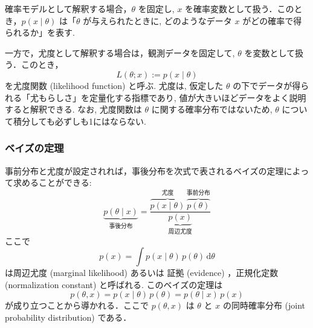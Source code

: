 \documentclass[titlepage]{ltjsbook}
\begin{document}
確率モデルとして解釈する場合，$\theta$ を固定し, $x$ を確率変数として扱う．このとき，$p(x \mid \theta)$ は「$\theta$ が与えられたときに, どのようなデータ $x$ がどの確率で得られるか」を表す. 

一方で，尤度として解釈する場合は，観測データを固定して, $\theta$ を変数として扱う．このとき，
\begin{equation}
L(\theta; x) := p(x \mid \theta)
\end{equation}
を尤度関数 (likelihood function) と呼ぶ. 尤度は, 仮定した $\theta$ の下でデータが得られる「尤もらしさ」を定量化する指標であり, 値が大きいほどデータをよく説明すると解釈できる. なお, 尤度関数は $\theta$ に関する確率分布ではないため, $\theta$ について積分しても必ずしも1にはならない. 

\subsubsection{ベイズの定理}
事前分布と尤度が設定されれば，事後分布を次式で表されるベイズの定理によって求めることができる: 
\begin{equation}
\underbrace{p(\theta \mid x)}_{\text{事後分布}} = \frac{\overbrace{p(x \mid \theta)}^{\text{尤度}}\, \overbrace{p(\theta)}^{\text{事前分布}}}{\underbrace{p(x)}_{\text{周辺尤度}}}
\end{equation}
ここで
\begin{equation}
p(x) = \int p(x \mid \theta)\, p(\theta)\, \mathrm{d}\theta
\end{equation}
は周辺尤度 (marginal likelihood) あるいは 証拠 (evidence) ，正規化定数 (normalization constant) と呼ばれる. このベイズの定理は
\begin{equation}
p(\theta, x) = p(x \mid \theta)\, p(\theta) = p(\theta \mid x)\, p(x)
\end{equation}
が成り立つことから導かれる．ここで $p(\theta, x)$ は $\theta$ と $x$ の同時確率分布 (joint probability distribution) である．
\end{document}
